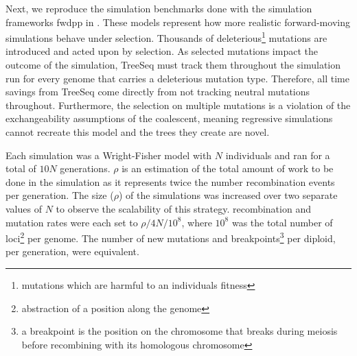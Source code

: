 \documentclass{article}
\begin{document}
Next, we reproduce the simulation benchmarks done with the simulation frameworks fwdpp in \cite{Ralph2018}.
These models represent how more realistic forward-moving simulations behave under selection. 
Thousands of deleterious\footnote{mutations which are harmful to an individuals fitness}
mutations are introduced and acted upon by selection.
As selected mutations impact the outcome of the simulation,
TreeSeq must track them throughout the simulation run for every genome that carries a deleterious mutation type.
Therefore, all time savings from TreeSeq come directly from not tracking neutral mutations throughout.
Furthermore, the selection on multiple mutations is a violation of the exchangeability assumptions of the coalescent,
meaning regressive simulations cannot recreate this model and the trees they create are novel.

Each simulation was a Wright-Fisher model with $N$ individuals and ran for a total of $10N$ generations.
$\rho$ is an estimation of the total amount of work to be done in the simulation
as it represents twice the number recombination events per generation.
The size ($\rho$) of the simulations was increased over two separate values of $N$
to observe the scalability of this strategy.
recombination and mutation rates were each set to $\rho / 4N / 10^{8}$, where $10^{8}$ was the total number of 
loci\footnote{abstraction of a position along the genome} 
per genome. 
The number of new mutations and breakpoints\footnote{a breakpoint is the position on the chromosome that breaks 
during meiosis before recombining with its homologous chromosome}
per diploid, per generation, were equivalent. 
\end{document}
